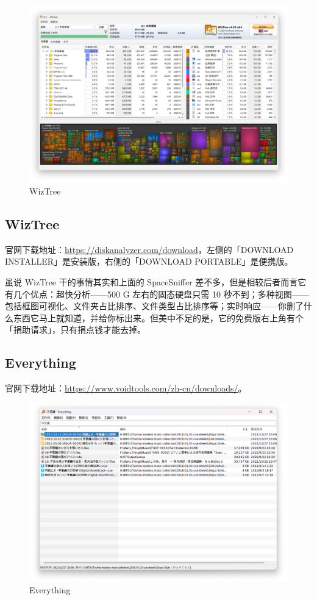 \begin{figure}[htb!]
  \centering
  \includegraphics[width=.65\textwidth]{assets/software/WizTree.png}
  \caption{WizTree}
  \label{fig:WizTree}
\end{figure}

\subsection{WizTree}

官网下载地址：\url{https://diskanalyzer.com/download}，左侧的「DOWNLOAD INSTALLER」是安装版，右侧的「DOWNLOAD PORTABLE」是便携版。

虽说 WizTree 干的事情其实和上面的 SpaceSniffer 差不多，但是相较后者而言它有几个优点：超快分析——500 G 左右的固态硬盘只需 10 秒不到；多种视图——包括框图可视化、文件夹占比排序、文件类型占比排序等；实时响应——你删了什么东西它马上就知道，并给你标出来。但美中不足的是，它的免费版右上角有个「捐助请求」，只有捐点钱才能去掉。

\subsection{Everything}

官网下载地址：\url{https://www.voidtools.com/zh-cn/downloads/}。

\begin{figure}[htb!]
  \centering
  \includegraphics[width=.85\textwidth]{assets/software/Everything.png}
  \caption{Everything}
  \label{Everything}
\end{figure}

